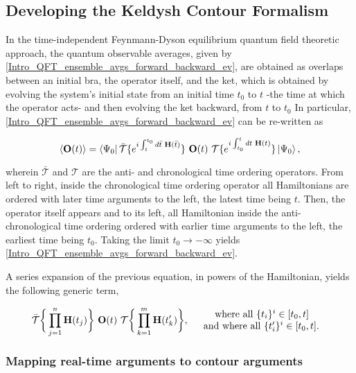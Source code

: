 \subsection{Developing the Keldysh Contour Formalism}

In the time-independent Feynmann-Dyson equilibrium quantum field theoretic approach, the quantum observable averages, given by \cref{Intro_QFT_ensemble_avgs_forward_backward_ev}, are obtained as overlaps between an initial bra, the operator itself, and the ket, which is obtained by evolving the system's initial state from an initial time $t_0$ to $t$ -the time at which the operator acts- and then evolving the ket backward, from $t$ to $t_0$
In particular, \cref{Intro_QFT_ensemble_avgs_forward_backward_ev} can be re-written as 

\[
    \langle {\bf O}(t) \rangle 
    = \bra{\Psi_0} 
       \bar{\mathcal{T}} \{ e^{i \int_{t}^{t_0} d\bar{t} \textnormal{ } {\bf H}(\bar{t})}\} \textnormal{ } {\bf O}(t) \textnormal{ } 
       {\mathcal{T}} \{ e^{i \int_{t_0}^{t} dt \textnormal{ } {\bf H}(t)}\}
    \ket{\Psi_0},
\]

wherein $\bar{\mathcal{T}}$ and $\mathcal{T}$ are the anti- and chronological time ordering operators.
From left to right, inside the chronological time ordering operator all Hamiltonians are ordered with later time arguments to the left, the latest time being $t$.
Then, the operator itself appears and to its left, all Hamiltonian inside the anti-chronological time ordering ordered with earlier time arguments to the left, the earliest time being $t_0$.
Taking the limit $t_0 \rightarrow -\infty$ yields \cref{Intro_QFT_ensemble_avgs_forward_backward_ev}. 

A series expansion of the previous equation, in powers of the Hamiltonian, yields the following generic term,

\[
    \bar{\mathcal{T}} \bigg\{
        \prod_{j = 1}^{n} {\bf H}(t_j) 
    \bigg\} \textnormal{ } {\bf O}(t) \textnormal{ } 
    \mathcal{T}
    \bigg\{
        \prod_{k=1}^{m} {\bf H}(t'_k) 
    \bigg\}, \quad \begin{array}{cc}
         \textnormal{where all $\{t_i\}^{i} \in [t_0, t]$ }  \\
         \textnormal{and where all $\{t'_i\}^{i} \in [t_0, t]$. }  
    \end{array}
\]

\subsubsection{Mapping real-time arguments to contour arguments}

